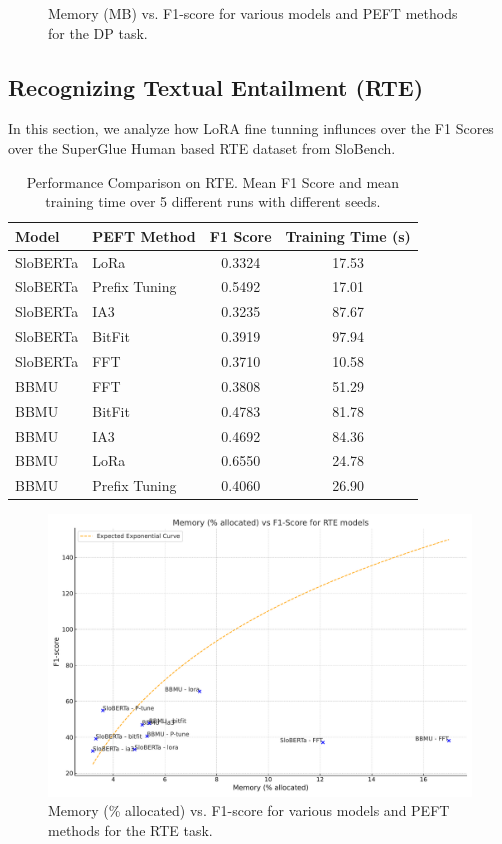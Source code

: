 \documentclass[fleqn,moreauthors,10pt]{ds_report}
\begin{document}
\begin{figure}[ht]
    \centering
    
    \caption{Memory (MB) vs. F1-score for various models and PEFT methods for the DP task. }
    \label{fig:memory_vs_f1_dp}
\end{figure}

\subsection{Recognizing Textual Entailment (RTE)}
In this section, we analyze how LoRA fine tunning influnces over the F1 Scores over the SuperGlue Human based RTE dataset from SloBench.
\begin{table}[ht]
\centering
\caption{Performance Comparison on RTE. Mean F1 Score and mean training time over 5 different runs with different seeds.}
\label{tab:rte_results_general}
\small
\begin{tabular}{@{}llcc@{}}
\toprule
Model & PEFT Method & F1 Score & Training Time (s) \\ \midrule
SloBERTa & LoRa & 0.3324 & 17.53 \\
SloBERTa & Prefix Tuning & 0.5492 & 17.01 \\
SloBERTa & IA3 & 0.3235 & 87.67 \\
SloBERTa & BitFit & 0.3919 & 97.94 \\
SloBERTa & FFT & 0.3710 & 10.58 \\
BBMU & FFT & 0.3808 & 51.29 \\
BBMU & BitFit & 0.4783 & 81.78 \\
BBMU & IA3 & 0.4692 & 84.36 \\
BBMU & LoRa & 0.6550 & 24.78 \\
BBMU & Prefix Tuning & 0.4060 & 26.90 \\
\bottomrule
\end{tabular}
\end{table}

\begin{figure}[ht]
    \centering
    \includegraphics[width=.5\textwidth]{fig/memory_vs_f1_score_rte_models.pdf}
    \caption{Memory (\% allocated) vs. F1-score for various models and PEFT methods for the RTE task.}
    \label{fig:memory_vs_f1_RTE}
\end{figure}
\end{document}
